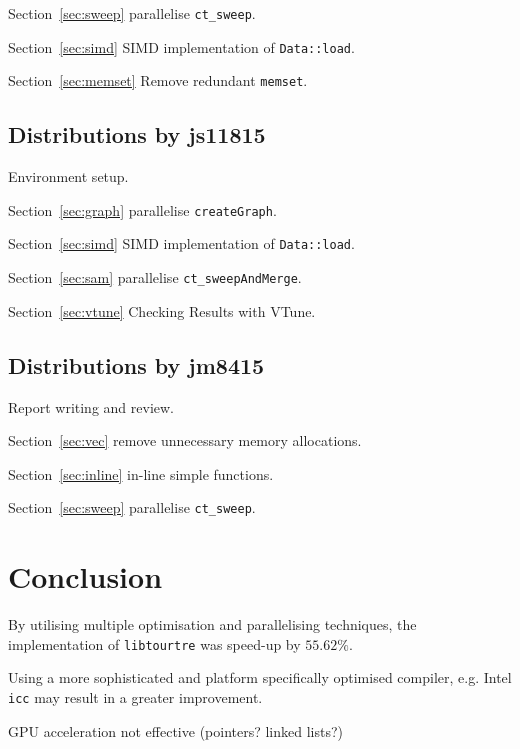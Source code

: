 \documentclass[conference]{IEEEtran}
\newcommand{\sref}[1]{Section~\ref{#1}}
\begin{document}
\sref{sec:sweep} parallelise \texttt{ct\_sweep}.

\sref{sec:simd} SIMD implementation of \texttt{Data::load}.

\sref{sec:memset} Remove redundant \texttt{memset}.


\subsection{Distributions by js11815}

Environment setup.

\sref{sec:graph} parallelise \texttt{createGraph}.

\sref{sec:simd} SIMD implementation of \texttt{Data::load}.

\sref{sec:sam} parallelise \texttt{ct\_sweepAndMerge}.

\sref{sec:vtune} Checking Results with VTune.


\subsection{Distributions by jm8415}

Report writing and review.

\sref{sec:vec} remove unnecessary memory allocations.

\sref{sec:inline} in-line simple functions.

\sref{sec:sweep} parallelise \texttt{ct\_sweep}.

\section{Conclusion}

By utilising multiple optimisation and parallelising techniques, the implementation of \texttt{libtourtre} was speed-up by $55.62 \%$.

Using a more sophisticated and platform specifically optimised compiler, e.g. Intel \texttt{icc} may result in a greater improvement.

GPU acceleration not effective (pointers? linked lists?)





\end{document}
